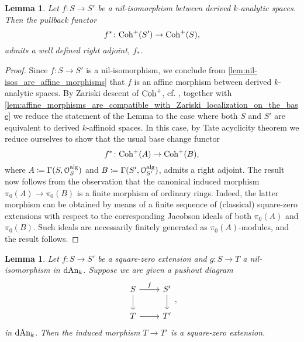 \documentclass[10pt,a4paper,reqno]{amsart} %
\theoremstyle{plain}
\newtheorem{lem}[thm]{Lemma}
\theoremstyle{definition}
\theoremstyle{remark}
\numberwithin{equation}{section}
\begin{document}
\begin{lem} \label{lem:f^*_admits_a_right_adjoint_whenever_f_is_nil-iso}
    Let $f \colon S \to S'$ be a nil-isomorphism between derived $k$-analytic spaces. Then the pullback functor
        \[
            f^* \colon \mathrm{Coh}^+(S') \to \mathrm{Coh}^+(S),  
        \]
    admits a well defined right adjoint, $f_*$.
\end{lem}

\begin{proof}
    Since $f \colon S \to S'$ is a nil-isomorphism, we conclude from \cref{lem:nil-isos_are_affine_morphisms} that $f$ is an affine morphism
    between derived $k$-analytic spaces. By Zariski descent of $\mathrm{Coh}^+$, cf. \cite[Theorem 3.7]{Antonio_Porta_Nonarchimedean_Hilbert},
    together with \cref{lem:affine_morphisms_are_compatible_with_Zariski_localization_on_the_base} we reduce the statement of the Lemma to the case
    where both $S$ and $S'$ are equivalent to derived $k$-affinoid spaces. In this case, by Tate acyclicity theorem we reduce ourselves
    to show that the usual base change functor
        \[
           f^* \colon  \mathrm{Coh}^+(A) \to \mathrm{Coh}^+(B)  ,
        \]
    where $A \coloneqq \Gamma(S, \mathcal O_S ^\mathrm{alg})$ and $B \coloneqq \Gamma(S', \mathcal O_{S'} ^\mathrm{alg})$, admits a right adjoint. The result now follows from the observation
    that the canonical induced morphism $\pi_0(A) \to \pi_0(B)$ is a finite morphism of ordinary rings. Indeed, the latter morphism can be obtained
    by means of a finite sequence of (classical) square-zero extensions with respect to the corresponding Jacobson ideals of both $\pi_0(A)$ and $\pi_0(B)$.
    Such ideals are necessarily finitely generated as $\pi_0(A)$-modules, and the result follows.
\end{proof}

\begin{lem} \label{lem:pushouts_of_square_zero_extensions_have_the_structure_of_a_square_zero_extension}
    Let $f \colon S \to S'$ be a square-zero extension and $g \colon S \to T$ a nil-isomorphism in $\mathrm{dAn}_k$. Suppose we are given a pushout diagram
        \[
        \begin{tikzcd}
            S \ar{r}{f} \ar{d} & S' \ar{d} \\
            T \ar{r} & T'  
        \end{tikzcd},
        \]
    in $\mathrm{dAn}_k$. Then the induced morphism $T \to T'$ is a square-zero extension.
\end{lem}
\end{document}
